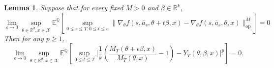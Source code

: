 \documentclass{article}
\newtheorem{lem}[thm]{Lemma}
\newcommand{\eps}{\epsilon}
\newcommand{\1}{\mathbbm{1}}
\newcommand{\op}{\mathrm{op}}
\newcommand{\E}{\mathbb E}
\renewcommand{\H}{\mathcal{H}}
\numberwithin{equation}{section}
\def\to{\rightarrow}
\def\eps{\varepsilon}
\def\E{{\bf E}} \def\H{{\bf H}} \def\J{{\bf J}}
\def\cX{\mathcal{X}}
\def\E{\mathbb{E}}
\def\sE{{\mathbb{E}}}
\def\sQ{{\mathbb{Q}}}
\def\sR{{\mathbb R}}
\begin{document}
\begin{lem}\label{lem:34_rescaled}
    Suppose that for every fixed $M>0$ and $\beta\in \mathbb{R}^{k}$,
    \begin{equation}\label{reg_cond}
    \lim_{\eps\to 0}\sup_{\theta\in \mathbb{R}^{d}, x\in \cX}\E^{\mathbb{Q}}\left[\sup_{0\leq s\leq T, 0\leq t\leq \eps}\|\nabla_{\theta} f(s, \bar a_{s}, \theta+t\beta, x)-\nabla_{\theta} f(s, \bar a_{s}, \theta, x)\|_{\op}^{M}\right]=0
    \end{equation}
    Then for any $p\geq 1$,
    \begin{equation}
        \lim_{\epsilon\to 0}\sup_{\theta\in\sR^d,x\in\cX}\sE^\sQ\left[\sup_{0\leq t\leq T}\bigg|\dfrac{1}{\eps}\left(\frac{M_T(\theta+\epsilon\beta,x)}{M_T(\theta,x)}-1\right)- Y_T({\theta,\beta},x)\bigg|^p\right]=0.
    \end{equation}   
\end{lem}
\end{document}
